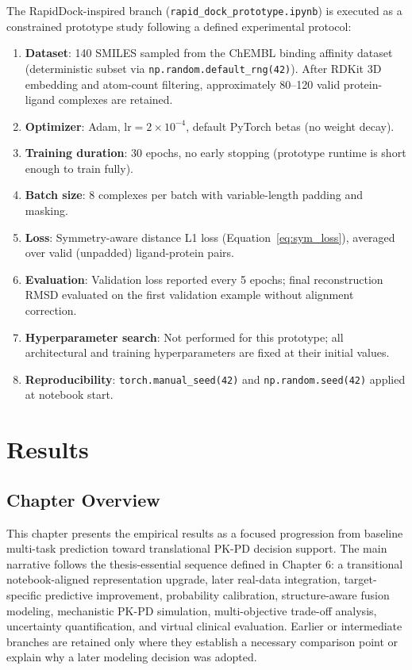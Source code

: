 \documentclass[a4paper,11pt,twoside]{report}
\begin{document}
The RapidDock-inspired branch (\texttt{rapid\_dock\_prototype.ipynb}) is executed as a constrained prototype study following a defined experimental protocol:

\begin{enumerate}
  \item \textbf{Dataset}: 140 SMILES sampled from the ChEMBL binding affinity dataset (deterministic subset via \texttt{np.random.default\_rng(42)}). After RDKit 3D embedding and atom-count filtering, approximately 80--120 valid protein-ligand complexes are retained.
  \item \textbf{Optimizer}: Adam, $\text{lr} = 2 \times 10^{-4}$, default PyTorch betas (no weight decay).
  \item \textbf{Training duration}: 30 epochs, no early stopping (prototype runtime is short enough to train fully).
  \item \textbf{Batch size}: 8 complexes per batch with variable-length padding and masking.
  \item \textbf{Loss}: Symmetry-aware distance L1 loss (Equation~\ref{eq:sym_loss}), averaged over valid (unpadded) ligand-protein pairs.
  \item \textbf{Evaluation}: Validation loss reported every 5 epochs; final reconstruction RMSD evaluated on the first validation example without alignment correction.
  \item \textbf{Hyperparameter search}: Not performed for this prototype; all architectural and training hyperparameters are fixed at their initial values.
  \item \textbf{Reproducibility}: \texttt{torch.manual\_seed(42)} and \texttt{np.random.seed(42)} applied at notebook start.
\end{enumerate}

\chapter{Results}

\section{Chapter Overview}

This chapter presents the empirical results as a focused progression from baseline multi-task prediction toward translational PK-PD decision support. The main narrative follows the thesis-essential sequence defined in Chapter 6: a transitional notebook-aligned representation upgrade, later real-data integration, target-specific predictive improvement, probability calibration, structure-aware fusion modeling, mechanistic PK-PD simulation, multi-objective trade-off analysis, uncertainty quantification, and virtual clinical evaluation. Earlier or intermediate branches are retained only where they establish a necessary comparison point or explain why a later modeling decision was adopted.
\end{document}
